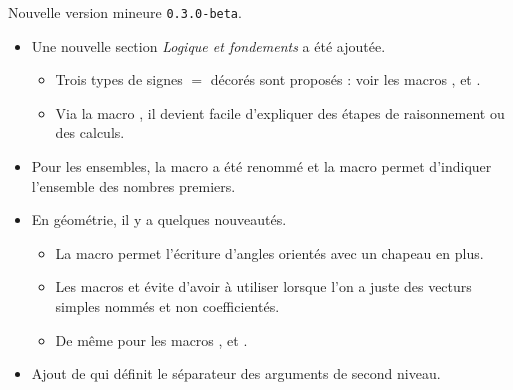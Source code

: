 Nouvelle version mineure \verb+0.3.0-beta+.

\begin{itemize}[itemsep=.5em]
    \item Une nouvelle section \emph{\og Logique et fondements \fg} a été ajoutée.
    \begin{itemize}[itemsep=.5em]
        \item Trois types de signes $=$ décorés sont proposés : voir les macros  ,  et .

        \item Via la macro , il devient facile d'expliquer des étapes de raisonnement ou des calculs.
    \end{itemize}




    \item Pour les ensembles, la macro  a été renommé  et la macro  permet d'indiquer l'ensemble des nombres premiers.




    \item En géométrie, il y a quelques nouveautés.
    \begin{itemize}[itemsep=.5em]
        \item La macro  permet l'écriture d'angles orientés avec un chapeau en plus.

        \item Les macros  et  évite d'avoir à utiliser  lorsque l'on a juste des vecturs simples nommés et non coefficientés.

        \item De même pour les macros ,  et .
    \end{itemize}




    \item Ajout de  qui définit le séparateur des arguments de second niveau.
\end{itemize}
